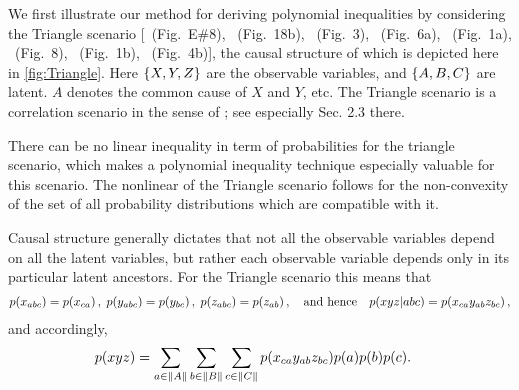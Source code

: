 We first illustrate our method for deriving polynomial inequalities by considering the Triangle scenario [\citealp{pusey2014gdag}~(Fig.~E\#8), \citealp{WoodSpekkens}~(Fig.~18b), \citealp{fritz2012bell}~(Fig.~3), \citealp{chaves2014novel}~(Fig.~6a), \citealp{Chaves2015infoquantum}~(Fig.~1a), \citealp{BilocalCorrelations}~(Fig.~8), \citealp{steudel2010ancestors}~(Fig.~1b), \citealp{chaves2014informationinference}~(Fig.~4b)], the causal structure of which is depicted here in \cref{fig:Triangle}. Here $\left\lbrace X,Y,Z\right\rbrace$ are the observable variables, and  $\left\lbrace A,B,C\right\rbrace$ are latent. $A$ denotes the common cause of $X$ and $Y$, etc. The Triangle scenario is a correlation scenario in the sense of \citet{fritz2012bell}; see especially Sec. 2.3 there.

There can be no linear inequality in term of probabilities for the triangle scenario, which makes a polynomial inequality technique especially valuable for this scenario. The nonlinear of the Triangle scenario follows for the non-convexity of the set of all probability distributions which are compatible with it. 

Causal structure generally dictates that not all the observable variables depend on all the latent variables, but rather each observable variable depends only in its particular latent ancestors. For the Triangle scenario this means that
\begin{align}\begin{split}\label{eq:tristructure}
p\lparen x_{a b c}\rparen=p\lparen x_{c a}\rparen \,,\; p\lparen y_{a b c}\rparen=p\lparen y_{b c}\rparen \,,\; p\lparen z_{a b c}\rparen=p\lparen z_{a b}\rparen \,,\quad\text{and hence}\quad p\lparen x y z | a b c\rparen=p\lparen x_{c a}  y_{a b}  z_{b c}\rparen\,,
\end{split}\end{align}
and accordingly, 
\begin{align}\label{eq:triintegration}
&p\lparen x y z\rparen=\sum\limits_{a\in \lVert A\rVert} \sum\limits_{b\in \lVert B\rVert} \sum\limits_{c\in \lVert C\rVert} p\lparen x_{c a}  y_{a b}  z_{b c}\rparen p\lparen a\rparen p\lparen b\rparen p\lparen c\rparen.
\end{align}

